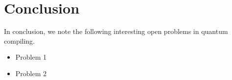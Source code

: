 \section{Conclusion}
\label{sec:qcompile-conclude}

In conclusion, we note the following interesting open problems in
quantum compiling.

\begin{itemize}

\item Problem 1

\item Problem 2

\end{itemize}